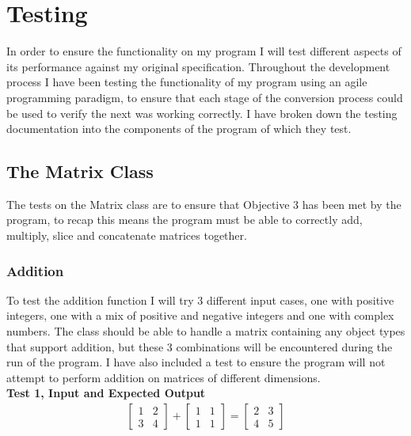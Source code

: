 \documentclass[12pt]{report}
\begin{document}
\section*{Testing}
In order to ensure the functionality on my program I will test different aspects of its performance against my original specification. Throughout the development process I have been testing the functionality of my program using an agile programming paradigm, to ensure that each stage of the conversion process could be used to verify the next was working correctly. I have broken down the testing documentation into the components of the program of which they test.

\subsection*{The Matrix Class}
The tests on the Matrix class are to ensure that Objective 3 has been met by the program, to recap this means the program must be able to correctly add, multiply, slice and concatenate matrices together.

\subsubsection*{Addition}
To test the addition function I will try 3 different input cases, one with positive integers, one with a mix of positive and negative integers and one with complex numbers. The class should be able to handle a matrix containing any object types that support addition, but these 3 combinations will be encountered during the run of the program. I have also included a test to ensure the program will not attempt to perform addition on matrices of different dimensions. \\

\textbf{Test 1, Input and Expected Output}
\begin{align*}
    \begin{bmatrix} 
        1 & 2 \\
        3 & 4
    \end{bmatrix} + 
    \begin{bmatrix} 
        1 & 1 \\
        1 & 1
    \end{bmatrix} = 
    \begin{bmatrix} 
        2 & 3 \\
        4 & 5
    \end{bmatrix}
\end{align*}
\end{document}
